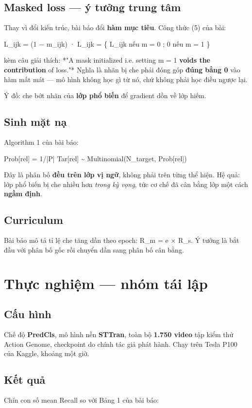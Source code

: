 \documentclass[11pt,a4paper]{article}
\newcommand{\code}[1]{{\ttfamily\small\color{codetext}#1}}
\begin{document}
\subsection{Masked loss --- ý tưởng trung tâm}
Thay vì đổi kiến trúc, bài báo đổi \textbf{hàm mục tiêu}. Công thức (5) của bài:

L\_ijk = (1 − m\_ijk) · L\_ijk = \{ L\_ijk nếu m = 0 ; 0 nếu m = 1 \}

kèm câu giải thích: *"A mask initialized i.e. setting m = 1 \textbf{voids the contribution} of loss."* Nghĩa là nhãn bị che phải đóng góp \textbf{đúng bằng 0} vào hàm mất mát --- mô hình không học gì từ nó, chứ không phải học điều ngược lại.

Ý đồ: che bớt nhãn của \textbf{lớp phổ biến} để gradient dồn về lớp hiếm.

\subsection{Sinh mặt nạ}
Algorithm 1 của bài báo:

Prob[rel] = 1/|P| Tar[rel] \textasciitilde{} Multinomial(N\_target, Prob[rel])

Đây là phân bố \textbf{đều trên lớp vị ngữ}, không phải trên từng thể hiện. Hệ quả: lớp phổ biến bị che nhiều hơn \emph{trong kỳ vọng}, tức cơ chế đã cân bằng lớp một cách \textbf{ngầm định}.

\subsection{Curriculum}
Bài báo mô tả tỉ lệ che tăng dần theo epoch: \code{R\_m = e × R\_s}. Ý tưởng là bắt đầu với phân bố gốc rồi chuyển dần sang phân bố cân bằng.

\section{Thực nghiệm --- nhóm tái lập}
\subsection{Cấu hình}
Chế độ \textbf{PredCls}, mô hình nền \textbf{STTran}, toàn bộ \textbf{1.750 video} tập kiểm thử Action Genome, checkpoint do chính tác giả phát hành. Chạy trên Tesla P100 của Kaggle, khoảng một giờ.

\subsection{Kết quả}
Chín con số mean Recall so với Bảng 1 của bài báo:
\end{document}
